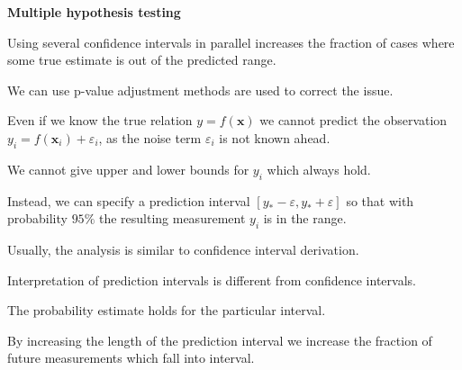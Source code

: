 \documentclass[landscape,footrule]{foils}
\renewcommand{\vec}[1]{\boldsymbol{#1}}
\begin{document}
\textbf{Multiple hypothesis testing}

\begin{triangles}
\item Using several confidence intervals in parallel increases the fraction of cases where some true estimate is out of the predicted range.
\item We can use p-value adjustment methods are used to correct the issue.
\end{triangles}  





Even if we know the true relation $y=f(\vec{x})$ we cannot predict the observation $y_{i}=f(\vec{x}_i)+\varepsilon_i$, as the noise term $\varepsilon_{i}$ is not known ahead.
\begin{triangles}
\item We cannot give upper and lower bounds for $y_i$ which always hold.
\end{triangles}
\vspace*{4ex}

Instead, we can specify a prediction interval $[y_*-\varepsilon, y_*+\varepsilon]$ so that with probability $95\%$ the resulting measurement $y_i$ is in the range.
\begin{triangles}
\item Usually, the analysis is similar to confidence interval derivation.
\end{triangles}  
\vspace*{4ex}

Interpretation of prediction intervals is different from confidence intervals.

\begin{triangles}
\item The probability estimate holds for the particular interval.
\end{triangles}  



By increasing the length of the prediction interval we increase the fraction of future measurements which fall into interval.


\end{document}
